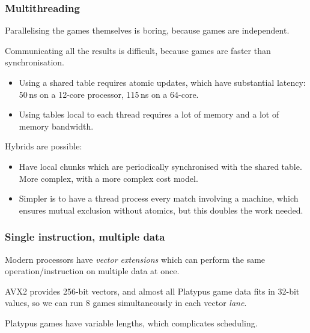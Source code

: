 \documentclass[aspectratio=169]{beamer}
\begin{document}
\begin{frame}
  \frametitle{Multithreading}
  Parallelising the games themselves is boring, because games are independent.

  Communicating all the results is difficult, because games are faster than synchronisation.

  \pause

  \begin{itemize}
  \item Using a shared table requires atomic updates, which have substantial latency:
    50\,ns on a 12-core processor, 115\,ns on a 64-core.
  \item Using tables local to each thread requires a lot of memory and a lot of memory
    bandwidth.
  \end{itemize}

  Hybrids are possible:

  \begin{itemize}
  \item Have local chunks which are periodically synchronised with the
    shared table. More complex, with a more complex cost model.
  \item Simpler is to have a thread process every match involving a machine,
    which ensures mutual exclusion without atomics, but this doubles the
    work needed.
  \end{itemize}
\end{frame}

\begin{frame}
  \frametitle{Single instruction, multiple data}

  Modern processors have \emph{vector extensions} which can perform the same
  operation/instruction on multiple data at once.

  AVX2 provides 256-bit vectors, and almost all Platypus game data fits in
  32-bit values, so we can run 8 games simultaneously in each vector \emph{lane}.

  Platypus games have variable lengths, which complicates scheduling.
\end{frame}

\newcommand{\game}[4]{
  \draw[fill=white] (#1, #2) rectangle +(#3, 0.5);
  \node at (#1 + 0.25, #2 + 0.25) {#4};
}
\end{document}
